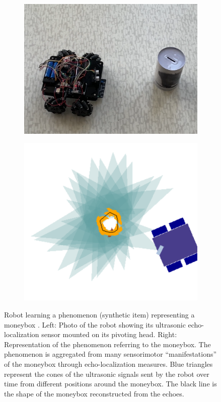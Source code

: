 \documentclass[runningheads]{llncs}
\begin{document}
\begin{figure}[htbp]
	\centering
	\begin{subfigure}{0.49\textwidth}
		\centering
		\includegraphics[width=\linewidth]{Figure_petitcat.png}
		\label{fig:first}
	\end{subfigure}
	\hfill
	\begin{subfigure}{0.49\textwidth}
		\centering
		\includegraphics[width=\linewidth]{Figure_phenomenon.png}
		\label{fig:second}
	\end{subfigure}
	\caption{Robot learning a phenomenon (synthetic item) representing a moneybox \cite[Fig. 5]{pmlr-v192-georgeon22a}.
		Left: Photo of the robot showing its ultrasonic echo-localization sensor mounted on its pivoting head. 
		Right: Representation of the phenomenon referring to the moneybox.
		The phenomenon is aggregated from many sensorimotor ``manifestations'' of the moneybox through echo-localization measures. Blue triangles represent the cones of the ultrasonic signals sent by the robot over time from different positions around the moneybox.
		The black line is the shape of the moneybox reconstructed from the echoes. 
	}
	\label{fig:both}
\end{figure}
\end{document}
